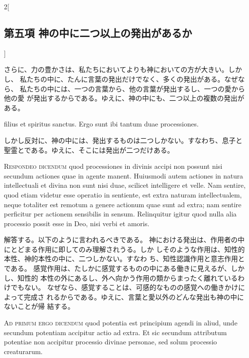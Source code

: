 \documentclass[paper=a4paper,fontsize=10pt,jafontsize=9pt,titlepage]{jlreq}
\begin{document}
\begin{paracol}{2}[\subsection{第五項 神の中に二つ以上の発出があるか}]
\switchcolumn


さらに、力の豊かさは、私たちにおいてよりも神においての方が大きい。しかし、
 私たちの中に、たんに言葉の発出だけでなく、多くの発出がある。なぜなら、
私たちの中には、一つの言葉から、他の言葉が発出するし、一つの愛から他の愛
 が発出するからである。ゆえに、神の中にも、二つ以上の複数の発出がある。


\switchcolumn*


filius et spiritus sanctus. Ergo sunt ibi tantum duae processiones.


\switchcolumn


しかし反対に、神の中には、発出するものは二つしかない。すなわち、息子と
 聖霊とである。ゆえに、そこには発出が二つだけある。




{\scshape Respondeo dicendum} quod processiones in divinis accipi non possunt nisi
 secundum actiones quae in agente manent. Huiusmodi autem actiones in
 natura intellectuali et divina non sunt nisi duae, scilicet intelligere
 et velle. Nam sentire, quod etiam videtur esse operatio in sentiente,
 est extra naturam intellectualem, neque totaliter est remotum a genere
 actionum quae sunt ad extra; nam sentire perficitur per actionem
 sensibilis in sensum. Relinquitur igitur quod nulla alia processio
 possit esse in Deo, nisi verbi et amoris.


\switchcolumn


解答する。以下のように言われるべきである。
神における発出は、作用者の中にとどまる作用に即してのみ理解されうる。しか
 しそのような作用は、知性的本性、神的本性の中に、二つしかない。すなわ
 ち、知性認識作用と意志作用とである。
感覚作用は、たしかに感覚するものの中にある働きに見えるが、しかし、知性的
 本性の外にあるし、外へ向かう作用の類からまったく離れているわけでもない。
 なぜなら、感覚することは、可感的なものの感覚への働きかけによって完成さ
 れるからである。ゆえに、言葉と愛以外のどんな発出も神の中にないことが帰
 結する。


\switchcolumn*[\subsection{ad.1}]


{\scshape Ad primum ergo dicendum} quod potentia est principium agendi in aliud,
 unde secundum potentiam accipitur actio ad extra. Et sic secundum
 attributum potentiae non accipitur processio divinae personae, sed
 solum processio creaturarum.



\end{paracol}
\end{document}
